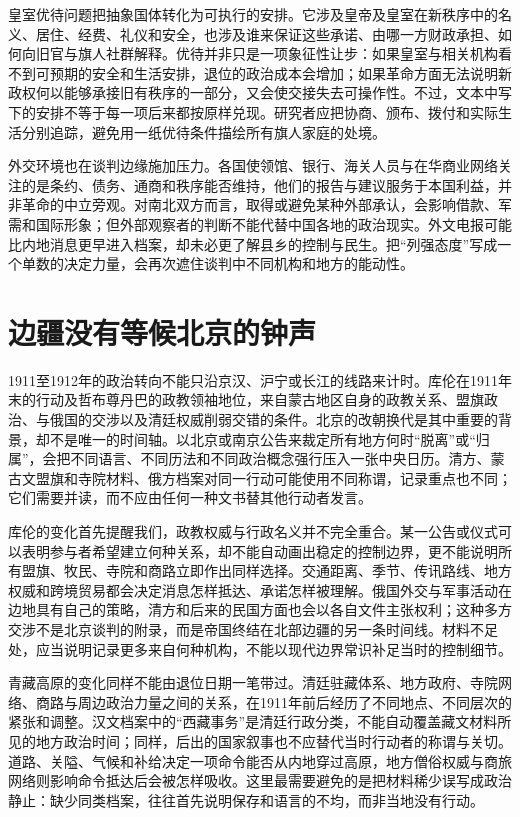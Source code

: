 皇室优待问题把抽象国体转化为可执行的安排。它涉及皇帝及皇室在新秩序中的名义、居住、经费、礼仪和安全，也涉及谁来保证这些承诺、由哪一方财政承担、如何向旧官与旗人社群解释。优待并非只是一项象征性让步：如果皇室与相关机构看不到可预期的安全和生活安排，退位的政治成本会增加；如果革命方面无法说明新政权何以能够承接旧有秩序的一部分，又会使交接失去可操作性。不过，文本中写下的安排不等于每一项后来都按原样兑现。研究者应把协商、颁布、拨付和实际生活分别追踪，避免用一纸优待条件描绘所有旗人家庭的处境。

外交环境也在谈判边缘施加压力。各国使领馆、银行、海关人员与在华商业网络关注的是条约、债务、通商和秩序能否维持，他们的报告与建议服务于本国利益，并非革命的中立旁观。对南北双方而言，取得或避免某种外部承认，会影响借款、军需和国际形象；但外部观察者的判断不能代替中国各地的政治现实。外文电报可能比内地消息更早进入档案，却未必更了解县乡的控制与民生。把“列强态度”写成一个单数的决定力量，会再次遮住谈判中不同机构和地方的能动性。

\section{边疆没有等候北京的钟声}

1911至1912年的政治转向不能只沿京汉、沪宁或长江的线路来计时。库伦在1911年末的行动及哲布尊丹巴的政教领袖地位，来自蒙古地区自身的政教关系、盟旗政治、与俄国的交涉以及清廷权威削弱交错的条件。北京的改朝换代是其中重要的背景，却不是唯一的时间轴。以北京或南京公告来裁定所有地方何时“脱离”或“归属”，会把不同语言、不同历法和不同政治概念强行压入一张中央日历。清方、蒙古文盟旗和寺院材料、俄方档案对同一行动可能使用不同称谓，记录重点也不同；它们需要并读，而不应由任何一种文书替其他行动者发言。

库伦的变化首先提醒我们，政教权威与行政名义并不完全重合。某一公告或仪式可以表明参与者希望建立何种关系，却不能自动画出稳定的控制边界，更不能说明所有盟旗、牧民、寺院和商路立即作出同样选择。交通距离、季节、传讯路线、地方权威和跨境贸易都会决定消息怎样抵达、承诺怎样被理解。俄国外交与军事活动在边地具有自己的策略，清方和后来的民国方面也会以各自文件主张权利；这种多方交涉不是北京谈判的附录，而是帝国终结在北部边疆的另一条时间线。材料不足处，应当说明记录更多来自何种机构，不能以现代边界常识补足当时的控制细节。

青藏高原的变化同样不能由退位日期一笔带过。清廷驻藏体系、地方政府、寺院网络、商路与周边政治力量之间的关系，在1911年前后经历了不同地点、不同层次的紧张和调整。汉文档案中的“西藏事务”是清廷行政分类，不能自动覆盖藏文材料所见的地方政治时间；同样，后出的国家叙事也不应替代当时行动者的称谓与关切。道路、关隘、气候和补给决定一项命令能否从内地穿过高原，地方僧俗权威与商旅网络则影响命令抵达后会被怎样吸收。这里最需要避免的是把材料稀少误写成政治静止：缺少同类档案，往往首先说明保存和语言的不均，而非当地没有行动。

